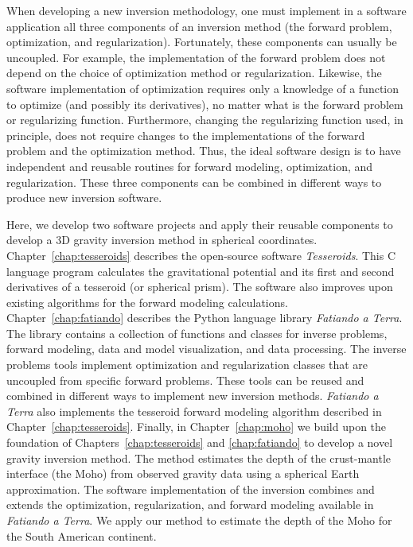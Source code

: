 When developing a new inversion methodology, one must implement in a software
application all three components of an inversion method (the forward problem,
optimization, and regularization).
Fortunately, these components can usually be uncoupled.
For example, the implementation of the forward problem does not depend on the
choice of optimization method or regularization.
Likewise, the software implementation of optimization requires only a knowledge
of a function to optimize (and possibly its derivatives), no matter what is the
forward problem or regularizing function.
Furthermore, changing the regularizing function used, in principle, does not
require changes to the implementations of the forward problem and the
optimization method.
Thus, the ideal software design is to have independent and reusable routines
for forward modeling, optimization, and regularization.
These three components can be combined in different ways to produce
new inversion software.

Here, we develop two software projects and apply their reusable components to
develop a 3D gravity inversion method in spherical coordinates.
Chapter~\ref{chap:tesseroids} describes the open-source software
\textit{Tesseroids}.
This C language program calculates the gravitational potential and its first
and second derivatives of a tesseroid (or spherical prism).
The software also improves upon existing algorithms for the forward modeling
calculations.
Chapter~\ref{chap:fatiando} describes the Python language library
\textit{Fatiando a Terra}.
The library contains a collection of functions and classes for inverse
problems, forward modeling, data and model visualization, and data processing.
The inverse problems tools implement optimization and regularization classes
that are uncoupled from specific forward problems.
These tools can be reused and combined in different ways to implement new
inversion methods.
\textit{Fatiando a Terra} also implements the tesseroid forward modeling
algorithm described in Chapter~\ref{chap:tesseroids}.
Finally, in Chapter~\ref{chap:moho} we build upon the foundation of
Chapters~\ref{chap:tesseroids} and \ref{chap:fatiando} to develop a novel
gravity inversion method.
The method estimates the depth of the crust-mantle interface (the Moho) from
observed gravity data using a spherical Earth approximation.
The software implementation of the inversion combines and extends the
optimization, regularization, and forward modeling available in
\textit{Fatiando a Terra}.
We apply our method to estimate the depth of the Moho for the South American
continent.
